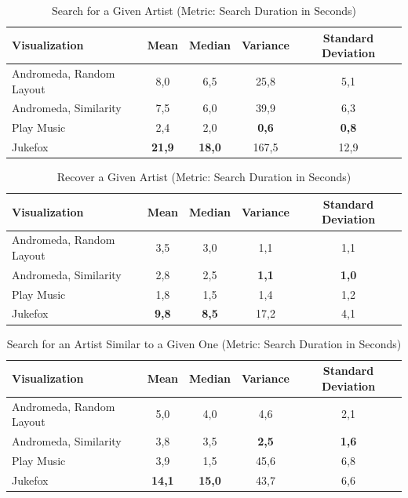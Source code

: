 \begin{table}[H]
\begin{center}
\begin{tabular}{ | l | c | c | c | c |}
	\hline
	\textbf{Visualization} & \textbf{Mean} & \textbf{Median} & \textbf{Variance} & \textbf{Standard Deviation}\\ \hline
	Andromeda, Random Layout & 8,0 & 6,5 & 25,8 & 5,1 \\ \hline
	Andromeda, Similarity & 7,5 & 6,0 & 39,9 & 6,3 \\ \hline
	Play Music & 2,4 & 2,0 & \textbf{0,6} & \textbf{0,8} \\ \hline
	Jukefox & \textbf{21,9} & \textbf{18,0} & 167,5 & 12,9 \\ \hline
\end{tabular}
\caption {Search for a Given Artist (Metric: Search Duration in Seconds)} \label{tab:search-for-given} 
\end{center}
\end{table}

\begin{table}[H]
\begin{center}
\begin{tabular}{ | l | c | c | c | c |}
	\hline
	\textbf{Visualization} & \textbf{Mean} & \textbf{Median} & \textbf{Variance} & \textbf{Standard Deviation}\\ \hline
	Andromeda, Random Layout & 3,5 & 3,0 & 1,1 & 1,1 \\ \hline
	Andromeda, Similarity & 2,8 & 2,5 & \textbf{1,1} & \textbf{1,0} \\ \hline
	Play Music & 1,8 & 1,5 & 1,4 & 1,2 \\ \hline
	Jukefox & \textbf{9,8} & \textbf{8,5} & 17,2 & 4,1 \\ \hline
\end{tabular}
\caption {Recover a Given Artist (Metric: Search Duration in Seconds)} \label{tab:refind-given} 
\end{center}
\end{table}

\begin{table}[H]
\begin{center}
\begin{tabular}{ | l | c | c | c | c |}
	\hline
	\textbf{Visualization} & \textbf{Mean} & \textbf{Median} & \textbf{Variance} & \textbf{Standard Deviation}\\ \hline
	Andromeda, Random Layout & 5,0 & 4,0 & 4,6 & 2,1 \\ \hline
	Andromeda, Similarity & 3,8 & 3,5 & \textbf{2,5} & \textbf{1,6} \\ \hline
	Play Music & 3,9 & 1,5 & 45,6 & 6,8 \\ \hline
	Jukefox & \textbf{14,1} & \textbf{15,0} & 43,7 & 6,6 \\ \hline
\end{tabular}
\caption {Search for an Artist Similar to a Given One (Metric: Search Duration in Seconds)} \label{tab:search-similar} 
\end{center}
\end{table}

